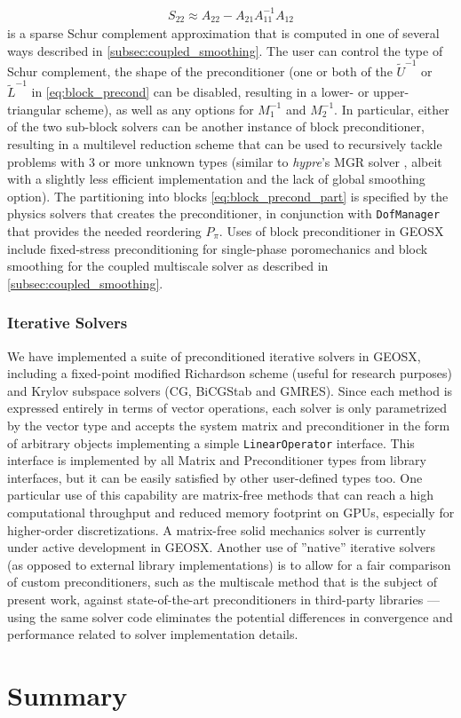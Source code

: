 \begin{align}
    S_{22} \approx A_{22} - A_{21} A_{11}^{-1} A_{12}
\end{align}
is a sparse Schur complement approximation that is computed in one of several ways described in \cref{subsec:coupled_smoothing}.   The user can control the type of Schur complement, the shape of the preconditioner (one or both of the $\widetilde{U}^{-1}$ or $\widetilde{L}^{-1}$ in \cref{eq:block_precond} can be disabled, resulting in a lower- or upper-triangular scheme), as well as any options for $M_1^{-1}$ and $M_2^{-1}$.   In particular, either of the two sub-block solvers can be another instance of block preconditioner, resulting in a multilevel reduction scheme that can be used to recursively tackle problems with 3 or more unknown types (similar to \textit{hypre}'s MGR solver \cite{Bui2020}, albeit with a slightly less efficient implementation and the lack of global smoothing option).   The partitioning into blocks \cref{eq:block_precond_part} is specified by the physics solvers that creates the preconditioner, in conjunction with \texttt{DofManager} that provides the needed reordering $P_\pi$.   Uses of block preconditioner in GEOSX include fixed-stress preconditioning for single-phase poromechanics \cite{White2015} and block smoothing for the coupled multiscale solver as described in \cref{subsec:coupled_smoothing}.

\subsubsection{Iterative Solvers}

We have implemented a suite of preconditioned iterative solvers in GEOSX, including a fixed-point modified Richardson scheme (useful for research purposes) and Krylov subspace solvers (CG, BiCGStab and GMRES).   Since each method is expressed entirely in terms of vector operations, each solver is only parametrized by the vector type and accepts the system matrix and preconditioner in the form of arbitrary objects implementing a simple \texttt{LinearOperator} interface.   This interface is implemented by all Matrix and Preconditioner types from library interfaces, but it can be easily satisfied by other user-defined types too.   One particular use of this capability are matrix-free methods that can reach a high computational throughput and reduced memory footprint on GPUs, especially for higher-order discretizations.   A matrix-free solid mechanics solver is currently under active development in GEOSX.   Another use of ''native'' iterative solvers (as opposed to external library implementations) is to allow for a fair comparison of custom preconditioners, such as the multiscale method that is the subject of present work, against state-of-the-art preconditioners in third-party libraries --- using the same solver code eliminates the potential differences in convergence and performance related to solver implementation details.

\section{Summary}
\label{sec:geosx_summary}
